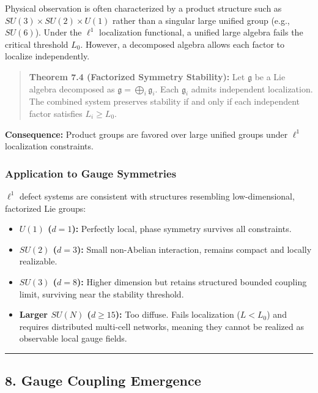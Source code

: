 \documentclass[
]{article}
\providecommand{\tightlist}{%
  \setlength{\itemsep}{0pt}\setlength{\parskip}{0pt}}
\begin{document}
Physical observation is often characterized by a product structure such
as \(SU(3) \times SU(2) \times U(1)\) rather than a singular large
unified group (e.g., \(SU(6)\)). Under the \(\ell^1\) localization
functional, a unified large algebra fails the critical threshold
\(L_0\). However, a decomposed algebra allows each factor to localize
independently.

\begin{quote}
\textbf{Theorem 7.4 (Factorized Symmetry Stability):} Let
\(\mathfrak{g}\) be a Lie algebra decomposed as
\(\mathfrak{g} = \bigoplus_i \mathfrak{g}_i\). Each \(\mathfrak{g}_i\)
admits independent localization. The combined system preserves stability
if and only if each independent factor satisfies \(L_i \ge L_0\).
\end{quote}

\textbf{Consequence:} Product groups are favored over large unified
groups under \(\ell^1\) localization constraints.

\subsubsection{Application to Gauge
Symmetries}\label{application-to-gauge-symmetries}

\(\ell^1\) defect systems are consistent with structures resembling
low-dimensional, factorized Lie groups:

\begin{itemize}
\tightlist
\item
  \textbf{\(U(1)\) (\(d=1\)):} Perfectly local, phase symmetry survives
  all constraints.
\item
  \textbf{\(SU(2)\) (\(d=3\)):} Small non-Abelian interaction, remains
  compact and locally realizable.
\item
  \textbf{\(SU(3)\) (\(d=8\)):} Higher dimension but retains structured
  bounded coupling limit, surviving near the stability threshold.
\item
  \textbf{Larger \(SU(N)\) (\(d \ge 15\)):} Too diffuse. Fails
  localization (\(L < L_0\)) and requires distributed multi-cell
  networks, meaning they cannot be realized as observable local gauge
  fields.
\end{itemize}

\begin{center}\rule{0.5\linewidth}{0.5pt}\end{center}

\subsection{8. Gauge Coupling Emergence}\label{gauge-coupling-emergence}
\end{document}
